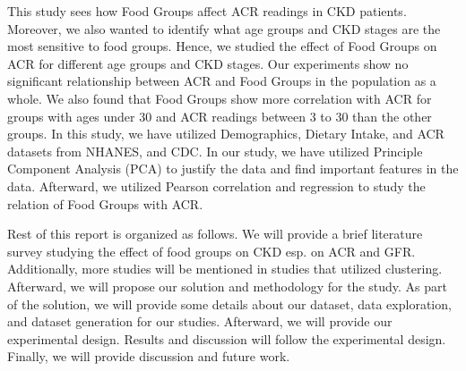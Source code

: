 \flushleft \justifying This study sees how Food Groups affect ACR readings in CKD patients. Moreover, we also wanted to identify what age groups and CKD stages are the most sensitive to food groups. Hence, we studied the effect of Food Groups on ACR for different age groups and CKD stages. Our experiments show no significant relationship between ACR and Food Groups in the population as a whole. We also found that Food Groups show more correlation with ACR for groups with ages under 30 and ACR readings between 3 to 30 than the other groups. In this study, we have utilized Demographics, Dietary Intake, and ACR datasets from NHANES, and CDC. In our study, we have utilized Principle Component Analysis (PCA) to justify the data and find important features in the data. Afterward, we utilized Pearson correlation and regression to study the relation of Food Groups with ACR.

\flushleft \justifying Rest of this report is organized as follows. We will provide a brief literature survey studying the effect of food groups on CKD esp. on ACR and GFR. Additionally, more studies will be mentioned in studies that utilized clustering. Afterward, we will propose our solution and methodology for the study. As part of the solution, we will provide some details about our dataset, data exploration, and dataset generation for our studies. Afterward, we will provide our experimental design. Results and discussion will follow the experimental design. Finally, we will provide discussion and future work.
